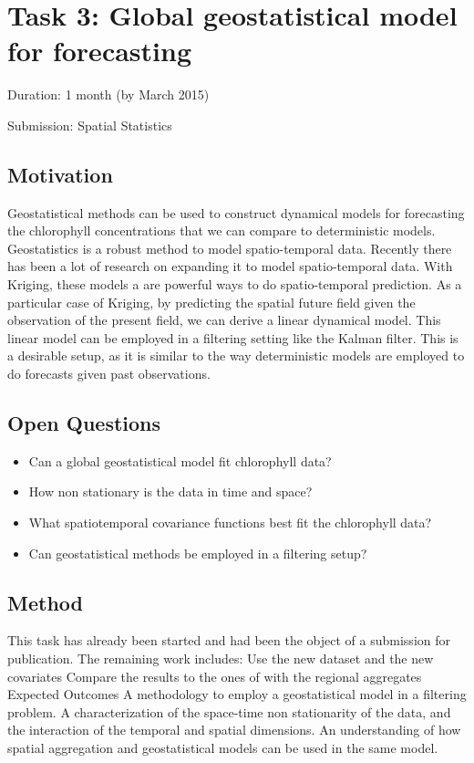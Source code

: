 \section{Task 3: Global geostatistical model for forecasting}

Duration: 1 month (by March 2015)

Submission: Spatial Statistics

\subsection{Motivation}

Geostatistical methods can be used to construct dynamical models for forecasting the chlorophyll concentrations that we can compare to deterministic models. Geostatistics is a robust method to model spatio-temporal data. Recently there has been a lot of research on expanding it to model spatio-temporal data. With Kriging, these models a are powerful ways to do spatio-temporal prediction. As a particular case of Kriging, by predicting the spatial future field given the observation of the present field, we can derive a linear dynamical model. This linear model can be employed in a filtering setting like the Kalman filter. This is a desirable setup, as it is similar to the way deterministic models are employed to do forecasts given past observations. 

\subsection{Open Questions}

\begin{itemize}
\item Can a global geostatistical model fit chlorophyll data?
\item How non stationary is the data in time and space?
\item What spatiotemporal covariance functions best fit the chlorophyll data?
\item Can geostatistical methods be employed in a filtering setup?
\end{itemize}

\subsection{Method}

This task has already been started and had been the object of a submission for publication. The remaining work includes:
Use the new dataset and the new covariates
Compare the results to the ones of with the regional aggregates
Expected Outcomes
A methodology to employ a geostatistical model in a filtering problem.
A characterization of the space-time non stationarity of the data, and the interaction of the temporal and spatial dimensions.
An understanding of how spatial aggregation and geostatistical models can be used in the same model. 

